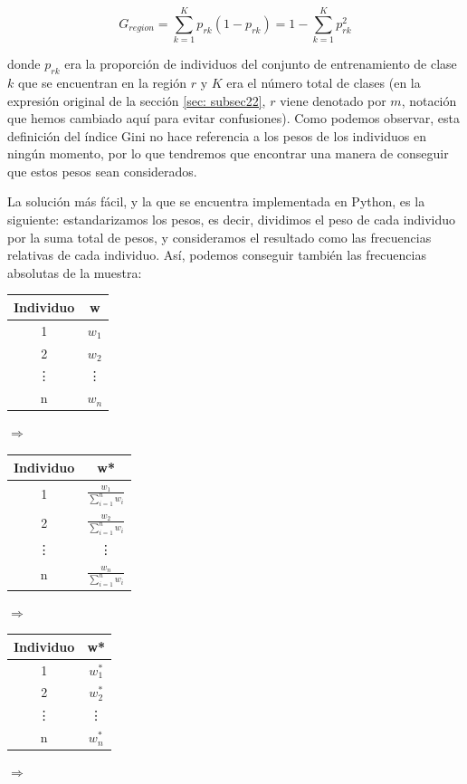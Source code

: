 \documentclass[12pt,twoside]{article}
\begin{document}
\begin{equation*}
G_{region} = \sum_{k=1}^K p_{rk}(1 - p_{rk}) = 1 - \sum_{k=1}^K p_{rk}^2
\end{equation*}

\noindent
donde $p_{rk}$ era la proporción de individuos del conjunto de entrenamiento de clase $k$ que se encuentran en la región $r$ y $K$ era el número total de clases (en la expresión original de la sección \ref{sec: subsec22}, $r$ viene denotado por $m$, notación que hemos cambiado aquí para evitar confusiones). Como podemos observar, esta definición del índice Gini no hace referencia a los pesos de los individuos en ningún momento, por lo que tendremos que encontrar una manera de conseguir que estos pesos sean considerados.

La solución más fácil, y la que se encuentra implementada en Python, es la siguiente: estandarizamos los pesos, es decir, dividimos el peso de cada individuo por la suma total de pesos, y consideramos el resultado como las frecuencias relativas de cada individuo. Así, podemos conseguir también las frecuencias absolutas de la muestra:
\begin{table}[h]
\centering
\begin{tabular}{|c|c|}
\hline
Individuo & w \\ \hline
1 & $w_1$ \\ \hline
2 & $w_2$ \\ \hline
\vdots & \vdots \\ \hline
n & $w_n$ \\ \hline
\end{tabular}
$\Rightarrow$
\begin{tabular}{|c|c|}
\hline
Individuo & w* \\ \hline
1 & $\frac{w_1}{\sum_{i=1}^n w_i}$ \\ \hline
2 & $\frac{w_2}{\sum_{i=1}^n w_i}$ \\ \hline
\vdots & \vdots \\ \hline
n & $\frac{w_n}{\sum_{i=1}^n w_i}$ \\ \hline
\end{tabular}
$\Rightarrow$
\begin{tabular}{|c|c|}
\hline
Individuo & w* \\ \hline
1 & $w_1^*$ \\ \hline
2 & $w_2^*$ \\ \hline
\vdots & \vdots \\ \hline
n & $w_n^*$ \\ \hline
\end{tabular}
$\Rightarrow$
\end{table}
\end{document}
